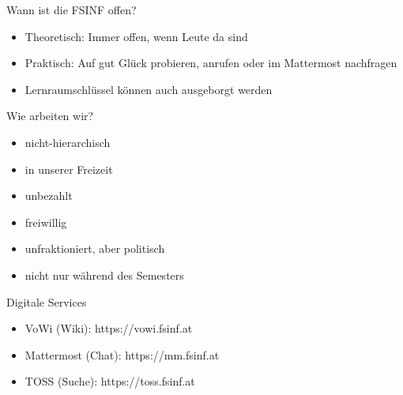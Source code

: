 \documentclass{beamer}
\begin{document}
\begin{frame}{Wann ist die FSINF offen?}
    \begin{itemize}
        \item Theoretisch: Immer offen, wenn Leute da sind
        \item Praktisch: Auf gut Glück probieren, anrufen oder im Mattermost nachfragen
        \item Lernraumschlüssel können auch ausgeborgt werden
    \end{itemize}
\end{frame}

\begin{frame}{Wie arbeiten wir?}
    \begin{itemize}
        \item nicht-hierarchisch
        \item in unserer Freizeit
        \item unbezahlt
        \item freiwillig
        \item unfraktioniert, aber politisch
        \item nicht nur während des Semesters
    \end{itemize}
\end{frame}

\begin{frame}{Digitale Services}
    \begin{itemize}
        \item VoWi (Wiki): https://vowi.fsinf.at
        \item Mattermost (Chat): https://mm.fsinf.at
        \item TOSS (Suche): https://toss.fsinf.at
    \end{itemize}
\end{frame}
\end{document}
